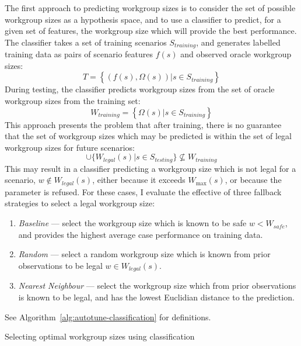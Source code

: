 The first approach to predicting workgroup sizes is to consider the
set of possible workgroup sizes as a hypothesis space, and to use a
classifier to predict, for a given set of features, the workgroup size
which will provide the best performance. The classifier takes a set of
training scenarios $S_{training}$, and generates labelled training
data as pairs of scenario features $f(s)$ and observed oracle
workgroup sizes:
%
\begin{equation}
  T = \left\{ \left(f(s), \Omega(s)\right) | s \in S_{training} \right\}
\end{equation}
%
During testing, the classifier predicts workgroup sizes from the set
of oracle workgroup sizes from the training set:
%
\begin{equation}
  W_{training} = \left\{ \Omega(s) | s \in S_{training} \right\}
\end{equation}
%
This approach presents the problem that after training, there is no
guarantee that the set of workgroup sizes which may be predicted is
within the set of legal workgroup sizes for future scenarios:
%
\begin{equation}
  \cup \{ W_{legal}(s) | s \in S_{testing} \} \nsubseteq W_{training}
\end{equation}
%
This may result in a classifier predicting a workgroup size which is
not legal for a scenario, $w \not\in W_{legal}(s)$, either because it
exceeds $W_{\max}(s)$, or because the parameter is refused. For these
cases, I evaluate the effective of three fallback strategies to select
a legal workgroup size:

\begin{enumerate}
\item \emph{Baseline} --- select the workgroup size which is known to
  be safe $w < W_{safe}$, and provides the highest average case
  performance on training data.
\item \emph{Random} --- select a random workgroup size which is known
  from prior observations to be legal $w \in W_{legal}(s)$.
\item \emph{Nearest Neighbour} --- select the workgroup size which
  from prior observations is known to be legal, and has the lowest
  Euclidian distance to the prediction.
\end{enumerate}

See Algorithm~\ref{alg:autotune-classification} for definitions.

\begin{algorithm}

\caption{Selecting optimal workgroup sizes using classification}
\label{alg:autotune-classification}
\end{algorithm}

